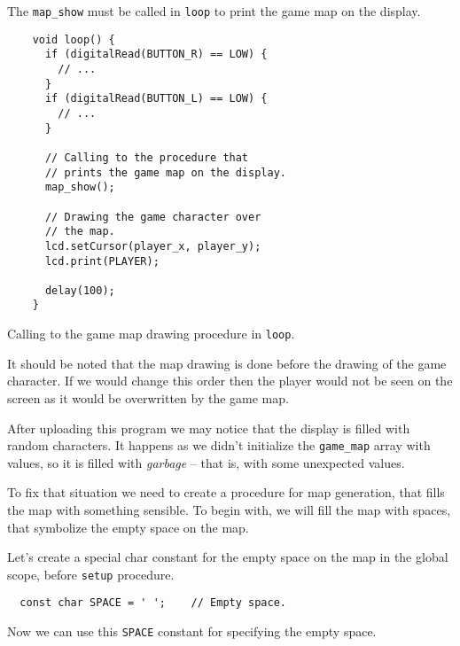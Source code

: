 \documentclass[../sparc.tex]{subfiles}
\begin{document}
The \texttt{map_show} must be called in \texttt{loop} to print
the game map on the display.

\begin{listing}[H]
  \begin{verbatim}
    void loop() {
      if (digitalRead(BUTTON_R) == LOW) {
        // ...
      }
      if (digitalRead(BUTTON_L) == LOW) {
        // ...
      }

      // Calling to the procedure that
      // prints the game map on the display.
      map_show();

      // Drawing the game character over
      // the map.
      lcd.setCursor(player_x, player_y);
      lcd.print(PLAYER);

      delay(100);
    }
  \end{verbatim}
  \caption{Calling to the game map drawing procedure in \texttt{loop}.}
  \label{listing:game-dev-map-show-call}
\end{listing}

It should be noted that the map drawing is done before the drawing of the game
character.  If we would change this order then the player would not be seen on
the screen as it would be overwritten by the game map.

After uploading this program we may notice that the display is filled with
random characters.  It happens as we didn't initialize the
\texttt{game_map} array with values, so it is filled with
\emph{garbage} -- that is, with some unexpected values.

To fix that situation we need to create a procedure for map generation, that
fills the map with something sensible.  To begin with, we will fill the map with
spaces, that symbolize the empty space on the map.

Let's create a special char constant for the empty space on the map in the
global scope, before \texttt{setup} procedure.

\begin{verbatim}
  const char SPACE = ' ';    // Empty space.
\end{verbatim}

Now we can use this \texttt{SPACE} constant for specifying the empty
space.
\end{document}
